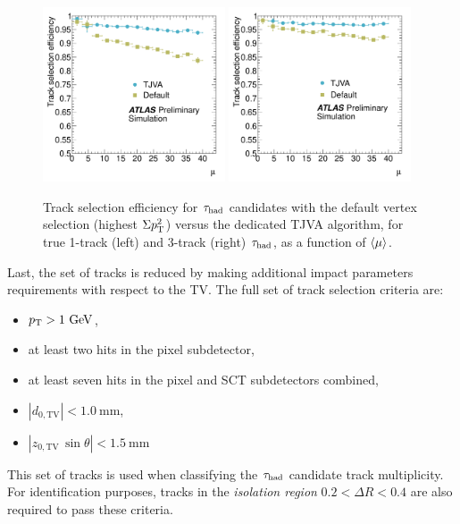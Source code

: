 \begin{figure}[tp]
  \centering
  \includegraphics[width=0.48\textwidth]{figures/ATLAS-CONF-2012-142/fig_01a}
  \includegraphics[width=0.48\textwidth]{figures/ATLAS-CONF-2012-142/fig_01b}
  \caption{Track selection efficiency for $\tau_\text{had}$ candidates with the default vertex selection (highest $\Sigma p_{\mathrm{T}}^2$) versus the dedicated TJVA algorithm, for true 1-track (left) and 3-track (right) $\tau_\text{had}$, as a function of $\langle\mu\rangle$.}
  \label{fig:taus-tjva}
\end{figure}

Last, the set of tracks is reduced by making additional impact parameters requirements with respect to the TV. The full set of track selection criteria are:
%
\begin{itemize}
    \item $p_{\mathrm{T}} > 1~\mathrm{GeV}$,
    \item at least two hits in the pixel subdetector,
    \item at least seven hits in the pixel and SCT subdetectors combined,
    \item $|d_{0,\text{TV}}| < 1.0~\mathrm{mm}$,
    \item $|z_{0,\text{TV}} \, \sin{\theta}| < 1.5~\mathrm{mm}$
\end{itemize}
%
This set of tracks is used when classifying the $\tau_\text{had}$ candidate track multiplicity. For identification purposes, tracks in the \textit{isolation region} $0.2 < \Delta R < 0.4$ are also required to pass these criteria.

